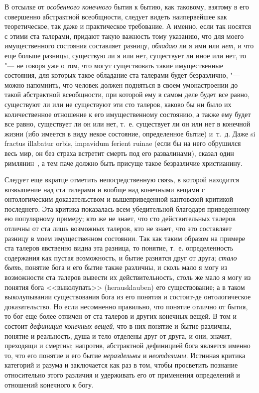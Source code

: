 В отсылке от {\em особенного конечного} бытия к бытию,
как таковому, взятому в его совершенно абстрактной всеобщности, следует
видеть наипервейшее как теоретическое, так даже и практическое требование.
А именно, если так носятся с этими ста талерами, придают такую важность
тому указанию, что для моего имущественного состояния составляет разницу,
{\em обладаю} ли я ими или
{\em нет}, и что еще больше разницы, существую ли я или
нет, существует ли иное или нет, то "--- не говоря уже о том, что могут
существовать такие имущественные состояния, для которых такое обладание ста
талерами будет безразлично, "--- можно напомнить, что человек должен подняться
в своем умонастроении до такой абстрактной всеобщности,
при которой ему в самом деле будет все равно, существуют ли или не
существуют эти сто талеров, каково бы ни было их количественное отношение к
его имущественному состоянию, а также ему будет все равно, существует ли он
или нет, т.~е. существует ли он или нет в конечной жизни (ибо имеется в
виду некое состояние, определенное бытие) и~т.~д. Даже si fractus illabatur
orbis, impavidum ferient ruinae (если бы на него обрушился весь мир, он без
страха встретит смерть под его развалинами), сказал один
римлянин~, а тем паче должно быть присуще такое
безразличие христианину.

Следует еще вкратце отметить непосредственную связь, в которой находится
возвышение над ста талерами и вообще над конечными вещами с онтологическим
доказательством и вышеприведенной кантовской критикой последнего. Эта
критика показалась всем убедительной благодаря приведенному ею популярному
примеру; кто же не знает, что сто действительных талеров отличны от ста
лишь возможных талеров, кто не знает, что это составляет разницу в моем
имущественном состоянии. Так как таким образом на примере ста талеров
явственно видна эта разница, то понятие, т.~е. определенность содержания
как пустая возможность, и бытие разнятся друг от друга;
{\em стало быть}, понятие бога и его бытие также
различны, и сколь мало я могу из возможности ста талеров вывести их
действительность, столь же мало я могу из понятия бога <<выколупать>>
(herausklauben) его существование; а в таком выколупывании существования
бога из его понятия и состоит-де онтологическое доказательство. Но если
несомненно правильно, что понятие отлично от бытия, то бог еще более
отличен от ста талеров и других конечных вещей. В том и состоит
{\em дефиниция конечных вещей}, что в них понятие и
бытие различны, понятие и реальность, душа и тело отделены друг от друга, и
они, значит, преходящи и смертны; напротив, абстрактной дефиницией бога
является именно то, что его понятие и его бытие
{\em нераздельны} и
{\em неотделимы}. Истинная критика категорий и разума и
заключается как раз в том, чтобы просветить познание относительно этого
различия и удерживать его от применения определений и отношений конечного к
богу.\label{bkm:bm85b}


